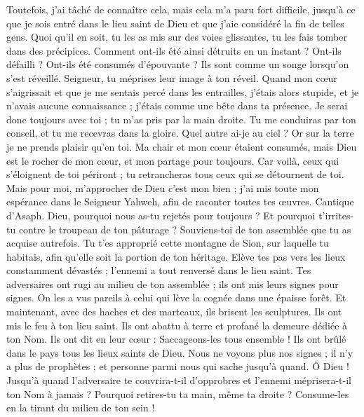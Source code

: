 \begin{multicols}{2}
Toutefois, j'ai tâché de connaître cela, mais cela m'a paru fort difficile,
jusqu’à ce que je sois entré dans le lieu saint de Dieu et que j'aie considéré la fin de telles gens.
Quoi qu'il en soit, tu les as mis sur des voies glissantes, tu les fais tomber dans des précipices.
Comment ont-ils été ainsi détruits en un instant ? Ont-ils défailli ? Ont-ils été consumés d'épouvante ?
Ils sont comme un songe lorsqu'on s'est réveillé. Seigneur, tu méprises leur image à ton réveil.
Quand mon cœur s'aigrissait et que je me sentais percé dans les entrailles,
j'étais alors stupide, et je n'avais aucune connaissance ; j'étais comme une bête dans ta présence.
Je serai donc toujours avec toi ; tu m'as pris par la main droite.
Tu me conduiras par ton conseil, et tu me recevras dans la gloire.
Quel autre ai-je au ciel ? Or sur la terre je ne prends plaisir qu’en toi.
Ma chair et mon cœur étaient consumés, mais Dieu est le rocher de mon cœur, et mon partage pour toujours.
Car voilà, ceux qui s'éloignent de toi périront ; tu retrancheras tous ceux qui se détournent de toi.
Mais pour moi, m’approcher de Dieu c’est mon bien ; j'ai mis toute mon espérance dans le Seigneur Yahweh, afin de raconter toutes tes œuvres.
\VerseOne{}Cantique d'Asaph. Dieu, pourquoi nous as-tu rejetés pour toujours ? Et pourquoi t’irrites-tu contre le troupeau de ton pâturage ?
Souviens-toi de ton assemblée que tu as acquise autrefois. Tu t'es approprié cette montagne de Sion, sur laquelle tu habitais, afin qu'elle soit la portion de ton héritage.
Elève tes pas vers les lieux constamment dévastés ; l'ennemi a tout renversé dans le lieu saint.
Tes adversaires ont rugi au milieu de ton assemblée ; ils ont mis leurs signes pour signes.
On les a vus pareils à celui qui lève la cognée dans une épaisse forêt.
Et maintenant, avec des haches et des marteaux, ils brisent les sculptures.
Ils ont mis le feu à ton lieu saint. Ils ont abattu à terre et profané la demeure dédiée à ton Nom.
Ils ont dit en leur cœur : Saccageons-les tous ensemble ! Ils ont brûlé dans le pays tous les lieux saints de Dieu.
Nous ne voyons plus nos signes ; il n'y a plus de prophètes ; et personne parmi nous qui sache jusqu’à quand.
Ô Dieu ! Jusqu’à quand l'adversaire te couvrira-t-il d'opprobres et l’ennemi méprisera-t-il ton Nom à jamais ?
Pourquoi retires-tu ta main, même ta droite ? Consume-les en la tirant du milieu de ton sein !

\end{multicols}
